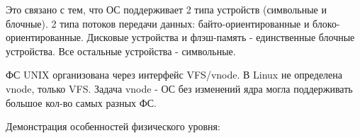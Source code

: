 \documentclass[12pt,a4paper]{scrreprt}
\begin{document}
Это связано с тем, что ОС поддерживает 2 типа устройств (символьные и блочные). 2 типа потоков передачи данных: байто-ориентированные и блоко-ориентированные. Дисковые устройства и флэш-память - единственные блочные устройства. Все остальные устройства - символьные.

ФС UNIX организована через интерфейс VFS/vnode. В Linux не определена vnode, только VFS. Задача vnode - ОС без изменений ядра могла поддерживать большое кол-во самых разных ФС.

\begin{figure}[!h]
\end{figure}

Демонстрация особенностей физического уровня:

\begin{figure}[!h]
\end{figure}
\end{document}

